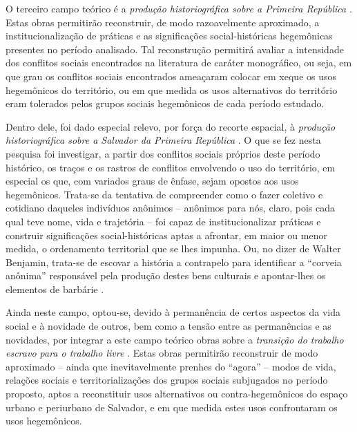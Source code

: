O terceiro campo teórico é a \textit{produção historiográfica sobre a Primeira República} \cite{BRUNO1967, carone_evolucao_1977, CARONE1970inst, faoro_donos_2001, fausto_hgcb1_1977, fausto_sociedade_1977, freyre_ordem_2004, janotti_subversivos_1986, leal_coronelismo_2012, LINS1988coro, PEDROSA1966a, PEDROSA1966b, pires_eleicoes_1995, saes_classemedia_1975, silva_historiaeconomica_2002}. Estas obras permitirão reconstruir, de modo razoavelmente aproximado, a institucionalização de práticas \cite{BERNARDO1991} e as significações social-históricas \cite{CASTORIADIS1982} hegemônicas presentes no período analisado. Tal reconstrução permitirá avaliar a intensidade dos conflitos sociais encontrados na literatura de caráter monográfico, ou seja, em que grau os conflitos sociais encontrados ameaçaram colocar em xeque os usos hegemônicos do território, ou em que medida os usos alternativos do território eram tolerados pelos grupos sociais hegemônicos de cada período estudado.

Dentro dele, foi dado especial relevo, por força do recorte espacial, à \textit{produção historiográfica sobre a Salvador da Primeira República} \cite{araujo_inventario_1992, castellucci_maquina_2008, CUNHA2011, sampaio_partidos_1978, sampaio_legislativo_1985, santos_associacao_1985, pang_coronelismo_1979}. O que se fez nesta pesquisa foi investigar, a partir dos conflitos sociais próprios deste período histórico, os traços e os rastros de conflitos envolvendo o uso do território, em especial os que, com variados graus de ênfase, sejam opostos aos usos hegemônicos. Trata-se da tentativa de compreender como o fazer coletivo e cotidiano daqueles indivíduos anônimos – anônimos para nós, claro, pois cada qual teve nome, vida e trajetória – foi capaz de institucionalizar práticas \cite{BERNARDO1991} e construir significações social-históricas \cite{CASTORIADIS1982} aptas a afrontar, em maior ou menor medida, o ordenamento territorial que se lhes impunha. Ou, no dizer de Walter Benjamin, trata-se de escovar a história a contrapelo para identificar a ``corveia anônima'' responsável pela produção destes bens culturais e apontar-lhes os elementos de barbárie \cite[p.~225]{BENJAMIN1987}.

Ainda neste campo, optou-se, devido à permanência de certos aspectos da vida social e à novidade de outros, bem como a tensão entre as permanências e as novidades, por integrar a este campo teórico obras sobre a \textit{transição do trabalho escravo para o trabalho livre }\cite{ANDRADE1988, AZEVEDO2004, brito2003abolicao, COSTA1991, DIAS2004, HOLTHE2003, mata2007libertos, MATTOS2008, MATTOSO1978, MATTOSO1992, MATTOSO1988, menezesfilho2007pos, MOURA1981, NASCIMENTO2007, REIS2000, REIS2004males, REISGOMES1996, REISSILVA1989, REIS2012, COSTA1989}. Estas obras permitirão reconstruir de modo aproximado – ainda que inevitavelmente prenhes do ``agora'' \cite[p.~229-230]{BENJAMIN1987} – modos de vida, relações sociais e territorializações dos grupos sociais subjugados no período proposto, aptos a reconstituir usos alternativos ou contra-hegemônicos do espaço urbano e periurbano de Salvador, e em que medida estes usos confrontaram os usos hegemônicos.

